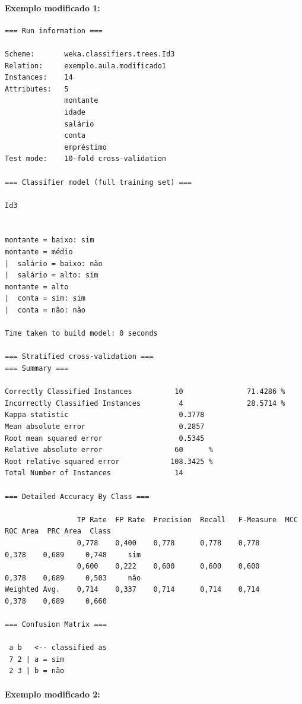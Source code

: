 \documentclass[
    article,            %
    11pt,               %
    oneside,            %
    a4paper,            %
    english,            %
    brazil,             %
    sumario=tradicional,
    ]{abntex2}
\begin{document}
\paragraph*{\textbf{Exemplo modificado 1:}}

\begin{Verbatim}[frame=single, fontsize=\tiny]
=== Run information ===

Scheme:       weka.classifiers.trees.Id3 
Relation:     exemplo.aula.modificado1
Instances:    14
Attributes:   5
              montante
              idade
              salário
              conta
              empréstimo
Test mode:    10-fold cross-validation

=== Classifier model (full training set) ===

Id3


montante = baixo: sim
montante = médio
|  salário = baixo: não
|  salário = alto: sim
montante = alto
|  conta = sim: sim
|  conta = não: não

Time taken to build model: 0 seconds

=== Stratified cross-validation ===
=== Summary ===

Correctly Classified Instances          10               71.4286 %
Incorrectly Classified Instances         4               28.5714 %
Kappa statistic                          0.3778
Mean absolute error                      0.2857
Root mean squared error                  0.5345
Relative absolute error                 60      %
Root relative squared error            108.3425 %
Total Number of Instances               14     

=== Detailed Accuracy By Class ===

                 TP Rate  FP Rate  Precision  Recall   F-Measure  MCC      ROC Area  PRC Area  Class
                 0,778    0,400    0,778      0,778    0,778      0,378    0,689     0,748     sim
                 0,600    0,222    0,600      0,600    0,600      0,378    0,689     0,503     não
Weighted Avg.    0,714    0,337    0,714      0,714    0,714      0,378    0,689     0,660     

=== Confusion Matrix ===

 a b   <-- classified as
 7 2 | a = sim
 2 3 | b = não
 \end{Verbatim}



\paragraph*{\textbf{Exemplo modificado 2:}}
\end{document}

